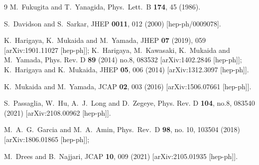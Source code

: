 \documentclass[aps,prev,twocolumn,preprintnumbers,floatfix,nofootinbib]{revtex4-1}
\begin{document}
\begin{thebibliography}{9}
  M.~Fukugita and T.~Yanagida,
  Phys.\ Lett.\ B {\bf 174}, 45 (1986).














  S.~Davidson and S.~Sarkar,
  JHEP {\bf 0011}, 012 (2000)
  [hep-ph/0009078].

  K.~Harigaya, K.~Mukaida and M.~Yamada,
JHEP \textbf{07} (2019), 059
[arXiv:1901.11027 [hep-ph]];
K.~Harigaya, M.~Kawasaki, K.~Mukaida and M.~Yamada,
Phys. Rev. D \textbf{89} (2014) no.8, 083532
[arXiv:1402.2846 [hep-ph]];
K.~Harigaya and K.~Mukaida,
JHEP \textbf{05}, 006 (2014)
[arXiv:1312.3097 [hep-ph]].

K.~Mukaida and M.~Yamada,
JCAP \textbf{02}, 003 (2016)
[arXiv:1506.07661 [hep-ph]].

S.~Passaglia, W.~Hu, A.~J.~Long and D.~Zegeye,
Phys. Rev. D \textbf{104}, no.8, 083540 (2021)
[arXiv:2108.00962 [hep-ph]].
 
  
 M.~A.~G.~Garcia and M.~A.~Amin,
  Phys.\ Rev.\ D {\bf 98}, no. 10, 103504 (2018)
  [arXiv:1806.01865 [hep-ph]];

M.~Drees and B.~Najjari,
JCAP \textbf{10}, 009 (2021)
[arXiv:2105.01935 [hep-ph]].


\end{thebibliography}
\end{document}
